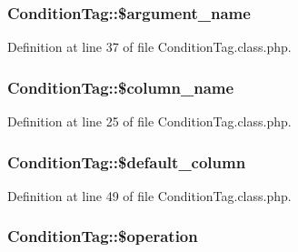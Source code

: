 \subsubsection[{\texorpdfstring{\$argument\+\_\+name}{$argument_name}}]{\setlength{\rightskip}{0pt plus 5cm}Condition\+Tag\+::\$argument\+\_\+name}\hypertarget{classConditionTag_a21ac5db76c722e4a9bc767d675bcc0c1}{}\label{classConditionTag_a21ac5db76c722e4a9bc767d675bcc0c1}


Definition at line 37 of file Condition\+Tag.\+class.\+php.

\subsubsection[{\texorpdfstring{\$column\+\_\+name}{$column_name}}]{\setlength{\rightskip}{0pt plus 5cm}Condition\+Tag\+::\$column\+\_\+name}\hypertarget{classConditionTag_a75d63b235f269dd4c12b3893fd456c10}{}\label{classConditionTag_a75d63b235f269dd4c12b3893fd456c10}


Definition at line 25 of file Condition\+Tag.\+class.\+php.

\subsubsection[{\texorpdfstring{\$default\+\_\+column}{$default_column}}]{\setlength{\rightskip}{0pt plus 5cm}Condition\+Tag\+::\$default\+\_\+column}\hypertarget{classConditionTag_ac401b3684262dd2a0ff53ff9a97864fe}{}\label{classConditionTag_ac401b3684262dd2a0ff53ff9a97864fe}


Definition at line 49 of file Condition\+Tag.\+class.\+php.

\subsubsection[{\texorpdfstring{\$operation}{$operation}}]{\setlength{\rightskip}{0pt plus 5cm}Condition\+Tag\+::\$operation}\hypertarget{classConditionTag_a0f8be8743e1e43b334ee1b46d25fd02e}{}\label{classConditionTag_a0f8be8743e1e43b334ee1b46d25fd02e}


